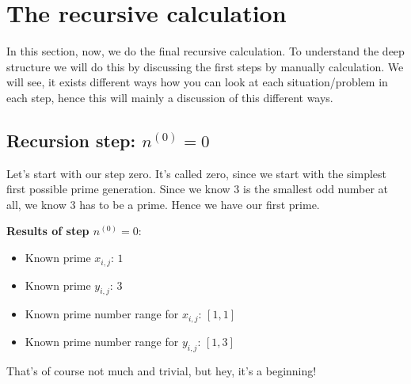 \chapter{The recursive calculation}
\label{ch:therecursivecalculation}
\minitoc
In this section, now, we do the final recursive calculation. To understand the deep structure we will do this by discussing the first steps by manually calculation. We will see, it exists different ways how you can look at each situation/problem in each step, hence this will mainly a discussion of this different ways.
\section{Recursion step: $n^{\left(0\right)} = 0$}
\label{s:recursionstepn0_0}
Let's start with our step zero. It's called zero, since we start with the simplest first possible prime generation. Since we know $3$ is the smallest odd number at all, we know $3$ has to be a prime. Hence we have our first prime.

\vspace{0.3cm}
\textbf{Results of step $n^{\left(0\right)} = 0$}:
\begin{itemize}
	\item Known prime $x_{i,j}$: $1$
	\item Known prime $y_{i,j}$: $3$
	\item Known prime number range for $x_{i,j}$: $[1,1]$
	\item Known prime number range for $y_{i,j}$: $[1,3]$
\end{itemize}

That's of course not much and trivial, but hey, it's a beginning!










